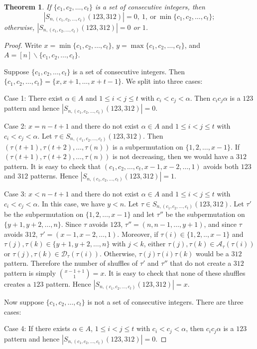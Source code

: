 \documentclass[11pt]{article}
\newtheorem{theorem}{Theorem}[section]
\theoremstyle{definition}
\numberwithin{equation}{section}
\begin{document}
\begin{theorem}
If $\{c_1,c_2,\ldots,c_t\}$ is a set of consecutive integers, then \[|S_{n,(c_1,c_2,\ldots,c_t)}(123,312)|=0,~1,\ \text{or}\ \min\{c_1,c_2,\ldots,c_t\};\] otherwise, $|S_{n,(c_1,c_2,\ldots,c_t)}(123,312)|=0$ or $1$.
\end{theorem}
\begin{proof}
Write $x=\min\{c_1,c_2,\ldots,c_t\}$, $y=\max\{c_1,c_2,\ldots,c_t\}$, and $A=[n]\backslash\{c_1,c_2,\ldots,c_t\}$. 

Suppose $\{c_1,c_2,\ldots,c_t\}$ is a set of consecutive integers. Then $\{c_1,c_2,\ldots,c_t\}=\{x,x+1,\ldots,x+t-1\}$. We split into three cases:

Case 1: There exist $\alpha\in A$ and $1\leq i<j\leq t$ with $c_i<c_j<\alpha$. Then $c_ic_j\alpha$ is a $123$ pattern and hence $|S_{n,(c_1,c_2,\ldots,c_t)}(123,312)|=0$.

Case 2: $x=n-t+1$ and there do not exist $\alpha\in A$ and $1\leq i<j\leq t$ with $c_i<c_j<\alpha$. Let $\tau\in S_{n,(c_1,c_2,\ldots,c_t)}(123,312)$. Then $(\tau(t+1),\tau(t+2),\ldots,\tau(n))$ is a subpermutation on $\{1,2,\ldots,x-1\}$. If $(\tau(t+1),\tau(t+2),\ldots,\tau(n))$ is not decreasing, then we would have a $312$ pattern. It is easy to check that $(c_1,c_2,\ldots,c_t,x-1,x-2,\ldots,1)$ avoids both $123$ and $312$ patterns. Hence $|S_{n,(c_1,c_2,\ldots,c_t)}(123,312)|=1$.

Case 3: $x<n-t+1$ and there do not exist $\alpha\in A$ and $1\leq i<j\leq t$ with $c_i<c_j<\alpha$. In this case, we have $y<n$. Let $\tau\in S_{n,(c_1,c_2,\ldots,c_t)}(123,312)$. Let $\tau'$ be the subpermutation on $\{1,2,\ldots,x-1\}$ and let $\tau''$ be the subpermutation on $\{y+1,y+2,\ldots,n\}$. 
        Since $\tau$ avoids $123$, $\tau''=(n,n-1,\ldots,y+1)$, and since $\tau$ avoids $312$, $\tau'=(x-1,x-2,\ldots,1)$. Moreover, if $\tau(i)\in\{1,2,..,x-1\}$ and $\tau(j),\tau(k)\in\{y+1,y+2,\ldots,n\}$ with $j<k$, 
either $\tau(j),\tau(k)\in\mathcal{A}_\tau(\tau(i))$ or $\tau(j),\tau(k)\in\mathcal{D}_\tau(\tau(i))$. Otherwise, $\tau(j)\tau(i)\tau(k)$ would be a $312$ pattern. Therefore
the number of shuffles of $\tau'$ and $\tau''$ that do not create a $312$ pattern is 
simply $\binom{x-1+1}{1}=x$. It is easy to check that none of these shuffles creates a $123$ pattern. Hence $|S_{n,(c_1,c_2,\ldots,c_t)}(123,312)|=x$.

Now suppose $\{c_1,c_2,\ldots,c_t\}$ is not a set of consecutive integers. There are three cases:

Case 4: If there exists $\alpha\in A$, $1\leq i<j\leq t$ with $c_i<c_j<\alpha$, then $c_ic_j\alpha$ is a $123$ pattern and hence $|S_{n,(c_1,c_2,\ldots,c_t)}(123,312)|=0$.


\end{proof}
\end{document}
